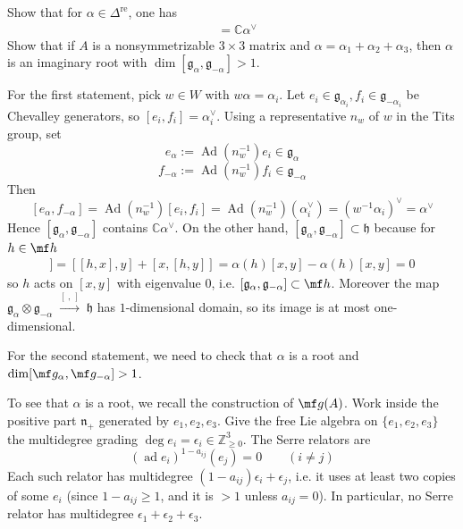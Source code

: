 \documentclass[12pt]{article}
\begin{document}
\begin{exercise}
    Show that for $\alpha \in \Delta^{\mathrm{re}}$, one has \begin{align*}
        [\mathfrak{g}_\alpha, \mathfrak{g}_{-\alpha}] & = \mathbb{C}\alpha^\vee
    \end{align*}
    Show that if $A$ is a nonsymmetrizable $3\times 3$ matrix and $\alpha = \alpha_1 + \alpha_2 + \alpha_3$, then $\alpha$ is an imaginary root with $\dim [\mathfrak{g}_\alpha, \mathfrak{g}_{-\alpha}] > 1$.
\end{exercise}

\begin{solution}[Incomplete]
    For the first statement, pick $w\in W$ with $w\alpha=\alpha_i$. Let $e_i\in\mathfrak g_{\alpha_i}, f_i\in\mathfrak g_{-\alpha_i}$ be Chevalley generators, so $[e_i,f_i]=\alpha_i^\vee$. Using a representative $n_w$ of $w$ in the Tits group, set
    \[e_\alpha:=\operatorname{Ad}(n_w^{-1})e_i\in\mathfrak g_\alpha\]\[
        f_{-\alpha}:=\operatorname{Ad}(n_w^{-1})f_i\in\mathfrak g_{-\alpha}\]
    Then
    \[[e_\alpha,f_{-\alpha}]
        =\operatorname{Ad}(n_w^{-1})[e_i,f_i]
        =\operatorname{Ad}(n_w^{-1})(\alpha_i^\vee)
        =(w^{-1}\alpha_i)^\vee=\alpha^\vee\]
    Hence $[\mathfrak g_\alpha,\mathfrak g_{-\alpha}]$ contains $\mathbb C\alpha^\vee$. On the other hand, $[\mathfrak g_\alpha,\mathfrak g_{-\alpha}]\subset\mathfrak h$ because for $h\in \mf h$ \begin{align*}
        [h,[x,y]] = [[h,x],y]+[x,[h,y]] = \alpha(h)[x,y]-\alpha(h)[x,y]=0
    \end{align*} so $h$ acts on $[x,y]$ with eigenvalue $0$, i.e. $[\mathfrak g_\alpha,\mathfrak g_{-\alpha}] \subset \mf h$.
    Moreover the map $\mathfrak g_\alpha \otimes \mathfrak g_{-\alpha}\;\xrightarrow{[\ ,\ ]}\; \mathfrak h$ has $1$-dimensional domain, so its image is at most one-dimensional.


    For the second statement, we need to check that $\alpha$ is a root and $\dim [\mf g_\alpha,\mf g_{-\alpha}]>1$.

    To see that $\alpha$ is a root, we recall the construction of $\mf g(A)$. Work inside the positive part $\mathfrak{n}_+$ generated by $e_1,e_2,e_3$. Give the free Lie algebra on $\{e_1,e_2,e_3\}$ the multidegree grading $\deg e_i=\epsilon_i\in\mathbb{Z}_{\ge0}^3$. The Serre relators are
    \[(\operatorname{ad}e_i)^{1-a_{ij}}(e_j)=0\qquad(i\neq j)\]
    Each such relator has multidegree $(1-a_{ij})\epsilon_i+\epsilon_j$, i.e. it uses at least two copies of some $e_i$ (since $1-a_{ij}\ge1$, and it is $>1$ unless $a_{ij}=0$).  In particular, no Serre relator has multidegree $\epsilon_1+\epsilon_2+\epsilon_3$.


\end{solution}
\end{document}
